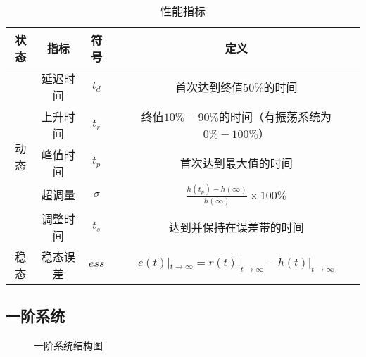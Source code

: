 \documentclass[
12pt, %
a4paper, 
oneside, %
headinclude,footinclude, %
]{scrartcl}
\begin{document}
\begin{table}[H]
\centering
\begin{tabular}{|c|c|c|c|}
\hline
状态 & 指标 & 符号 & 定义 \\
\hline
\multirow{5}{*}{动态} & 延迟时间 & $ t_d $ & 首次达到终值$ 50\% $的时间 \\
\cline{2-4}
& 上升时间 & $ t_r $ & 终值$ 10\% - 90\% $的时间（有振荡系统为$ 0\% - 100\% $） \\
\cline{2-4}
& 峰值时间 & $ t_p $ & 首次达到最大值的时间 \\
\cline{2-4}
& 超调量 & $ \sigma $ & $ \frac{h(t_p) - h(\infty)}{h(\infty)} \times 100\% $ \\
\cline{2-4}
& 调整时间 & $ t_s $ & 达到并保持在误差带的时间 \\
\hline
稳态 & 稳态误差 & $ ess $ & $ e(t)|_{t \to \infty} = r(t)|_{t \to \infty} - h(t)|_{t \to \infty} $ \\
\hline
\end{tabular}
\caption{性能指标}
\end{table}
\subsection[一阶系统]{一阶系统}
\begin{figure}[H]
\centering 
{}
\caption{一阶系统结构图}
\end{figure}
\end{document}
